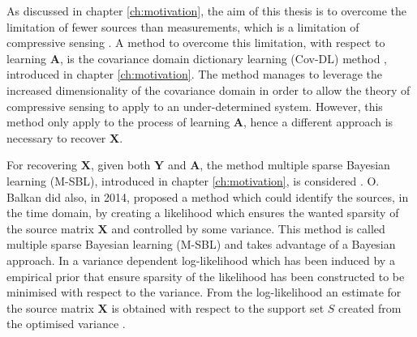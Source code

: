 As discussed in chapter \ref{ch:motivation}, the aim of this thesis is to overcome the limitation of fewer sources than measurements, which is a limitation of compressive sensing . 
A method to overcome this limitation, with respect to learning $\mathbf{A}$, is the covariance domain dictionary learning (Cov-DL) method \cite{Balkan2015}, introduced in chapter \ref{ch:motivation}. 
The method manages to leverage the increased dimensionality of the covariance domain in order to allow the theory of compressive sensing to apply to an under-determined system. 
However, this method only apply to the process of learning $\mathbf{A}$, hence a different approach is necessary to recover $\mathbf{X}$.

For recovering $\mathbf{X}$, given both $\mathbf{Y}$ and $\mathbf{A}$, the method multiple sparse Bayesian learning (M-SBL), introduced in chapter \ref{ch:motivation}, is considered .
O. Balkan \cite{Balkan2014} did also, in 2014, proposed a method which could identify the sources, in the time domain, by creating a likelihood which ensures the wanted sparsity of the source matrix $\mathbf{X}$ and controlled by some variance. This method is called multiple sparse Bayesian learning (M-SBL) and takes advantage of a Bayesian approach. 
In \cite{Balkan2014} a variance dependent log-likelihood which has been induced by a empirical prior that ensure sparsity of the likelihood has been constructed to be minimised with respect to the variance. 
From the log-likelihood an estimate for the source matrix $\mathbf{X}$ is obtained with respect to the support set $S$ created from the optimised variance .






